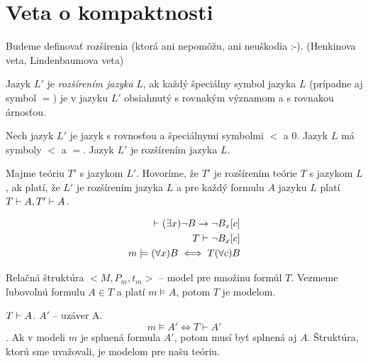 \section{Veta o kompaktnosti}

\startFIXME

Budeme definovať rozšírenia (ktorá ani nepomôžu, ani neuškodia :-). (Henkinova
veta, Lindenbaumova veta)

\begin{definicia}
    Jazyk $L'$ je \emph{rozšírením jazyka} $L$, ak každý
    špeciálny symbol jazyka $L$ (prípadne aj symbol $=$)
    je v jazyku $L'$ obsiahnutý s rovnakým významom a s rovnakou árnosťou.
\end{definicia}

\begin{priklad}
    Nech jazyk $L'$ je jazyk s rovnosťou a špeciálnymi symbolmi $<$ a $0$.
    Jazyk $L$ má symboly $<$ a $=$. Jazyk $L'$ je rozšírením jazyka $L$.
\end{priklad}    

\begin{definicia}
    Majme teóriu $T'$ s jazykom $L'$. Hovoríme, že $T'$ je
    rozšírením teórie $T$ s jazykom $L$, ak platí,
    že $L'$ je rozšírením jazyka $L$ a pre každý formulu $A$ jazyku $L$
    platí $T \vdash A, T' \vdash A$. 
\end{definicia}


\begin{veta}[Henkinova]
    \begin{align*}
        \vdash (\exists x) \neg B \rightarrow \neg B_x[c] \\
        T \vdash  \neg B_x[c] \\
        m \models  (\forall x) B \iff T (\forall c) B \\
    \end{align*}
\end{veta}


\par Relačná štruktúra $<M, P_m, t_m>$ -- model pre množinu formúl $T$. Vezmeme
ľubovoľnú formulu $A \in T$ a platí $m \models A$, potom $T$ je modelom.

\par $T \vdash A$. $A'$ -- uzáver A. $$ m \models A' \iff T \vdash A'$$. Ak v
modeli $m$ je splnená formula $A'$, potom musí byť splnená aj $A$. Štruktúra,
ktorú sme uvažovali, je modelom pre našu teóriu.

